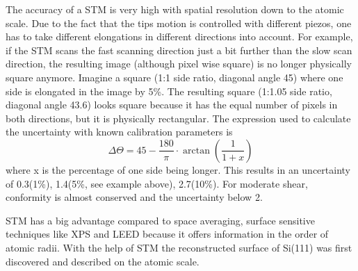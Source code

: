 The accuracy of a STM is very high with spatial resolution down to the atomic scale. Due to the fact that the tips motion is controlled with different piezos, one has to take different elongations in different directions into account. For example, if the STM scans the fast scanning direction just a bit further than the slow scan direction, the resulting image (although pixel wise square) is no longer physically square anymore. Imagine a square (1:1 side ratio, diagonal angle 45\textdegree) where one side is elongated in the image by 5\%. The resulting square (1:1.05 side ratio, diagonal angle 43.6\textdegree) looks square because it has the equal number of pixels in both directions, but it is physically rectangular. The expression used to calculate the uncertainty with known calibration parameters is
$$\Delta \Theta = 45 - \frac{180}{\pi}\cdot\arctan(\frac{1}{1+x})$$ where x is the percentage of one side being longer. This results in an uncertainty of 0.3\textdegree(1\%), 1.4\textdegree(5\%, see example above), 2.7\textdegree(10\%). For moderate shear, conformity is almost conserved and the uncertainty below 2\textdegree.

STM has a big advantage compared to space averaging, surface sensitive techniques like XPS and LEED because it offers information in the  order of atomic radii. With the help of STM the reconstructed surface of Si(111) was first discovered \cite{binnig_1983} and described on the atomic scale.